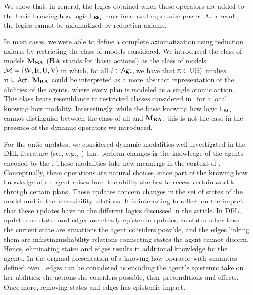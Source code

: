 We show that, in general, the logics obtained when these operators are added to the basic knowing how logic $\mathsf{L}_{{\sf Kh}_i}$ have increased expressive power.  As a result, the logics cannot be axiomatized by reduction axioms. 

\begin{mrevised}
In most cases, we were able to define a complete axiomatization using reduction axioms by restricting the class of models considered.  We introduced the class of models $\mathbf{M}_{\mathbf{BA}}$ (\textbf{BA} stands for `basic actions') as the class of models $\mathcal{M} = \langle \operatorname{W}, \operatorname{R}, \operatorname{U}, \operatorname{V} \rangle$ in which, for all $i \in {\rm \sf Agt}$, we have that $\uppi \in \operatorname{U}(i)$ implies $\uppi \subseteq {\rm \sf Act}$.  $\mathbf{M}_{\mathbf{BA}}$ could be interpreted as a more abstract representation of the abilities of the agents, where every plan is modeled as a single atomic action.  This class bears resemblance to restricted classes considered in~\cite{Li21} for a local knowing how modality.
Interestingly, while the basic knowing how logic $\mathsf{L}_{{\sf Kh}_i}$ cannot distinguish between the class of all \ults and $\mathbf{M}_{\mathbf{BA}}$, this is not the case in the presence of the dynamic operators we introduced. 

For the ontic updates, we considered dynamic modalities well investigated in the DEL literature (see, e.g.,~\cite{Plaza89:lopc,KooiR11,DELbook}) that perform changes in the knowledge of the agents encoded by the \lts. These modalities take new meanings in the context of .  Conceptually, these operations are natural choices, since part of the knowing how knowledge of an agent arises from the ability she has to access certain worlds through certain plans.  These updates concern changes in the set of states of the model and in the accessibility relations.  It is interesting to reflect on the impact that these updates have on the different logics discussed in the article.  In DEL, updates on states and edges are clearly epistemic updates, as states other than the current state are situations the agent considers possible, and the edges linking them are indistinguishability relations connecting states the agent cannot discern.  Hence, eliminating states and edges results in additional knowledge for the agents.  In the original presentation of a knowing how operator with semantics defined over \lts, edges can be considered as encoding the agent's epistemic take on her abilities: the actions she considers possible, their preconditions and effects.  Once more, removing states and edges has epistemic impact.  



\end{mrevised}
